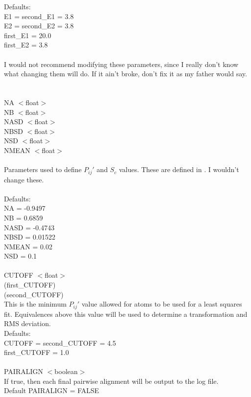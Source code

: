 Defaults:\\
 E1 = second\_E1 = 3.8\\
 E2 = second\_E2 = 3.8\\
 first\_E1 = 20.0\\
 first\_E2 =  3.8\\
\\
I would not recommend modifying these parameters, since I really
don't know what changing them will do.  If it ain't broke, don't
fix it as my father would say.\\
\\
\\
NA    $<$float$>$\\
NB    $<$float$>$\\
NASD  $<$float$>$\\
NBSD  $<$float$>$\\
NSD   $<$float$>$\\
NMEAN $<$float$>$\\
\\
Parameters used to define $P_{ij}{\prime}$ and $S_{c}$ values.  These are 
defined in \cite{rb92b}.  I wouldn't change these. \\
\\
Defaults:\\
  NA    = -0.9497\\
  NB    =  0.6859\\
  NASD  = -0.4743\\
  NBSD  =  0.01522\\
  NMEAN =  0.02\\
  NSD   =  0.1\\
\\
CUTOFF $<$float$>$\\
(first\_CUTOFF)\\
(second\_CUTOFF)\\
This is the minimum $P_{ij}{\prime}$ value allowed for atoms to be used 
for a  least squares fit.  Equivalences above this value will be used to
determine a transformation and RMS deviation.\\
Defaults:\\
 CUTOFF = second\_CUTOFF = 4.5\\
 first\_CUTOFF = 1.0\\
\\
PAIRALIGN $<$boolean$>$\\
If true, then each final pairwise alignment will be output to the
log file.\\
Default PAIRALIGN = FALSE\\
\\
